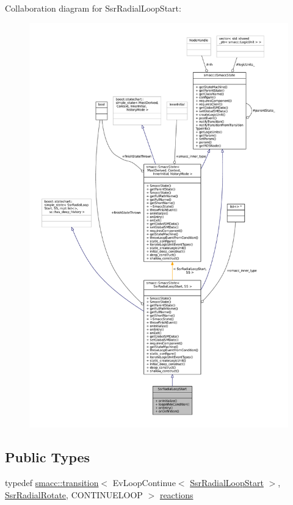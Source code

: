 Collaboration diagram for Ssr\+Radial\+Loop\+Start\+:
\nopagebreak
\begin{figure}[H]
\begin{center}
\leavevmode
\includegraphics[width=350pt]{structSsrRadialLoopStart__coll__graph}
\end{center}
\end{figure}
\subsection*{Public Types}
\begin{DoxyCompactItemize}
\item 
typedef \hyperlink{classsmacc_1_1transition}{smacc\+::transition}$<$ Ev\+Loop\+Continue$<$ \hyperlink{structSsrRadialLoopStart}{Ssr\+Radial\+Loop\+Start} $>$, \hyperlink{structSsrRadialRotate}{Ssr\+Radial\+Rotate}, C\+O\+N\+T\+I\+N\+U\+E\+L\+O\+OP $>$ \hyperlink{structSsrRadialLoopStart_a182ebeeec9ed788811d32ad023e13269}{reactions}
\end{DoxyCompactItemize}
